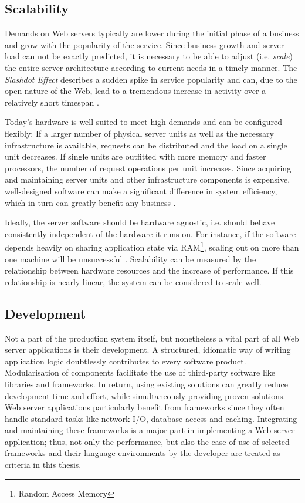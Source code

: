 \subsection{Scalability}
Demands on Web servers typically are lower during the initial phase of a business and grow with the popularity of the service. Since business growth and server load can not be exactly predicted, it is necessary to be able to adjust (i.e. \textit{scale}) the entire server architecture according to current needs in a timely manner. The \textit{Slashdot Effect} describes a sudden spike in service popularity and can, due to the open nature of the Web, lead to a tremendous increase in activity over a relatively short timespan \cite[p. 1]{Drolia2010}. 

Today's hardware is well suited to meet high demands and can be configured flexibly: If a larger number of physical server units as well as the necessary infrastructure is available, requests can be distributed and the load on a single unit decreases. If single units are outfitted with more memory and faster processors, the number of request operations per unit increases. Since acquiring and maintaining server units and other infrastructure components is expensive, well-designed software can make a significant difference in system efficiency, which in turn can greatly benefit any business \cite[p. 11]{Hughes-Croucher2012}.

Ideally, the server software should be hardware agnostic, i.e. should behave consistently independent of the hardware it runs on. For instance, if the software depends heavily on sharing application state via RAM\footnote{Random Access Memory}, scaling out on more than one machine will be unsuccessful \cite{Veal2007}. Scalability can be measured by the relationship between hardware resources and the increase of performance. If this relationship is nearly linear, the system can be considered to scale well.

\subsection{Development}
Not a part of the production system itself, but nonetheless a vital part of all Web server applications is their development. A structured, idiomatic way of writing application logic doubtlessly contributes to every software product. Modularisation of components facilitate the use of third-party software like libraries and frameworks. In return, using existing solutions can greatly reduce development time and effort, while simultaneously providing proven solutions. Web server applications particularly benefit from frameworks since they often handle standard tasks like network I/O, database access and caching\cite[Foreword]{Reelsen2011}. Integrating and maintaining these frameworks is a major part in implementing a Web server application; thus, not only the performance, but also the ease of use of selected frameworks and their language environments by the developer are treated as criteria in this thesis.



